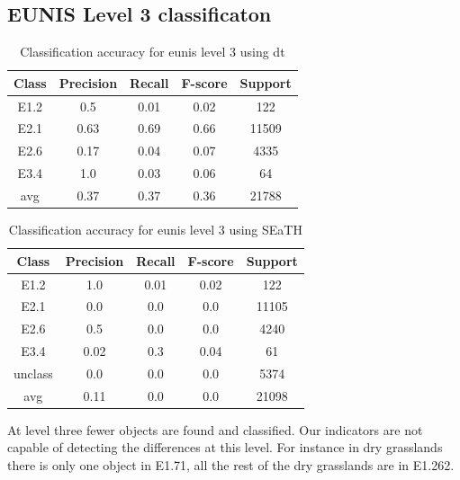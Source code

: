 \documentclass[authoryear,preprint,12pt,number]{elsarticle}
\begin{document}
\subsection{EUNIS Level 3 classificaton}
\begin{table}
\centering
\begin{tabular}{c c c c c}
Class & Precision & Recall & F-score & Support\\
\hline
E1.2 & 0.5 & 0.01 & 0.02 & 122\\
E2.1 & 0.63 & 0.69 & 0.66 & 11509\\
E2.6 & 0.17 & 0.04 & 0.07 & 4335\\
E3.4 & 1.0 & 0.03 & 0.06 & 64\\
avg & 0.37 & 0.37 & 0.36 & 21788\\
\end{tabular}
\caption{Classification accuracy for \gls{eunis} level 3 using \gls{dt}}
\end{table}
\begin{table}
\centering
\begin{tabular}{c c c c c}
Class & Precision & Recall & F-score & Support\\
\hline
E1.2 & 1.0 & 0.01 & 0.02 & 122\\
E2.1 & 0.0 & 0.0 & 0.0 & 11105\\
E2.6 & 0.5 & 0.0 & 0.0 & 4240\\
E3.4 & 0.02 & 0.3 & 0.04 & 61\\
unclass & 0.0 & 0.0 & 0.0 & 5374\\
avg & 0.11 & 0.0 & 0.0 & 21098\\
\end{tabular}
\caption{Classification accuracy for \gls{eunis} level 3 using SEaTH}
\end{table}
At level three fewer objects are found and classified. Our indicators are not 
capable of detecting the differences at this level. For instance in dry 
grasslands there is only one object in E1.71, all the rest of the dry 
grasslands are in E1.262.
\end{document}
